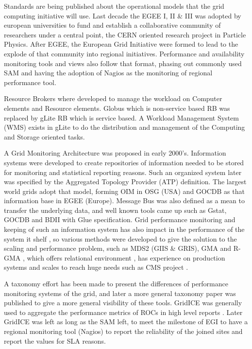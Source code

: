 Standards are being published about the operational models that the grid computing initiative will use. Last decade the EGEE I, II \& III was adopted by european universities to fund and establish a collaborative community of researchers under a central point, the CERN oriented research project in Particle Physics. After EGEE, the European Grid Initiative were formed to lead to the explode of that community into regional initiatives. Performance and availability monitoring tools and views also follow that format, phasing out commonly used SAM \cite{egee3dsa122} and having the adoption of Nagios as the monitoring of regional performance tool.

Resource Brokers \cite{Kertesz06ataxonomy} where developed to manage the workload on Computer elements and Resource elements. Globus which is non-service based RB was replaced by gLite RB which is service based. A Workload Management System (WMS) exists in gLite to do the distribution and management of the Computing and Storage oriented tasks.

A Grid Monitoring Architecture \cite{tierney2002grid} was proposed in early 2000's. Information systems were developed to create repositories of information needed to be stored for monitoring and statistical reporting reasons. Such an organized system later was specified by the Aggregated Topology Provider (ATP) definition. The largest world grids adopt that model, forming OIM in OSG (USA) and GOCDB as that information base in EGEE (Europe). Message Bus was also defined as a mean to transfer the underlying data, and well known tools came up such as Gstat, GOCDB and BDII with Glue specification. Grid performance monitoring and keeping of such an information system has also impact in the performance of the system it shelf \cite{zhang2003performance}, so various methods were developed to give the solution to the scaling and performance problem, such as MDS2 (GIIS \& GRIS), GMA and R-GMA \cite{wilson2004information}, which offers relational environment \cite{fisher2001relational}, has experience on production systems \cite{byrom-production} and scales to reach huge needs such as CMS project \cite{Bonacorsi2004,Byrom}.

A taxonomy effort has been made \cite{gerndt2004performance} to present the differences of performance monitoring systems of the grid, and later a more general \cite{zanikolas2007importance} taxonomy paper was published to give a more general visibility of these tools. GridICE was generally used to aggregate the performance metrics of ROCs in high level reports \cite{andreozzi2005gridice}. Later GridICE was left as long as the SAM left, to meet the milestone of EGI to have a regional monitoring tool (Nagios) to report the reliability of the joined sites and report the values for SLA reasons. 

